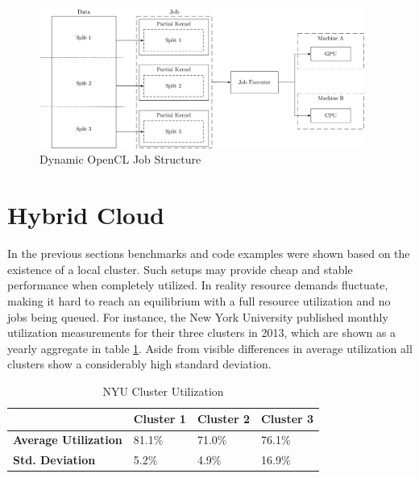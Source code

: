 \begin{figure}[H]
	\includegraphics[width=0.95\textwidth]{drawings/dynamic_opencl_job.pdf}
	\centering
	\caption{Dynamic OpenCL Job Structure}
	\label{img:dynamic_opencl_job}
\end{figure}


\section{Hybrid Cloud}
\label{main_hybrid_cloud}
In the previous sections benchmarks and code examples were shown based on the existence of a local cluster. Such setups may provide cheap and stable performance when completely utilized. In reality resource demands fluctuate, making it hard to reach an equilibrium with a full resource utilization and no jobs being queued. For instance, the New York University published monthly utilization measurements for their three clusters in 2013\cite{nyu}, which are shown as a yearly aggregate in table \ref{table:cluster_utilization}. Aside from visible differences in average utilization all clusters show a considerably high standard deviation.

\begin{table}[!htb]
	\centering
	\begin{adjustbox}{width=0.5\textwidth}
		\small
		\begin{tabular}{l | l | l | l}
			~						& \textbf{Cluster 1}	& \textbf{Cluster 2}	& \textbf{Cluster 3}                 \\
			\hline
			\textbf{Average Utilization} 	& 81.1\%  	& 71.0\% 	& 76.1\% \\
			\textbf{Std. Deviation}          & 5.2\%  	& 4.9\%		& 16.9\% \\
		\end{tabular}
	\end{adjustbox}

	\caption{NYU Cluster Utilization}
	\label{table:cluster_utilization}
\end{table}

